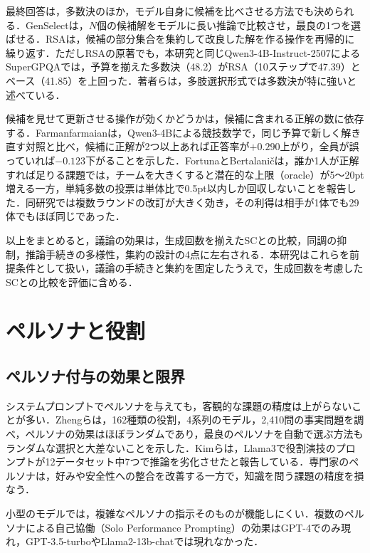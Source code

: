 最終回答は，多数決のほか，モデル自身に候補を比べさせる方法でも決められる．GenSelect\cite{toshniwal2025genselect}は，$N$個の候補解をモデルに長い推論で比較させ，最良の1つを選ばせる．RSA\cite{venkatraman2025rsa}は，候補の部分集合を集約して改良した解を作る操作を再帰的に繰り返す．ただしRSAの原著でも，本研究と同じQwen3-4B-Instruct-2507によるSuperGPQAでは，予算を揃えた多数決（48.2）がRSA（10ステップで47.39）とベース（41.85）を上回った．著者らは，多肢選択形式では多数決が特に強いと述べている．

候補を見せて更新させる操作が効くかどうかは，候補に含まれる正解の数に依存する．Farmanfarmaian\cite{farmanfarmaian2026candidatefree}は，Qwen3-4Bによる競技数学で，同じ予算で新しく解き直す対照と比べ，候補に正解が2つ以上あれば正答率が$+0.290$上がり，全員が誤っていれば$-0.123$下がることを示した．FortunaとBertalani\v{c}\cite{fortuna2026disjunctive}は，誰か1人が正解すれば足りる課題では，チームを大きくすると潜在的な上限（oracle）が5〜20pt増える一方，単純多数の投票は単体比で0.5pt以内しか回収しないことを報告した．同研究では複数ラウンドの改訂が大きく効き，その利得は相手が1体でも29体でもほぼ同じであった．

以上をまとめると，議論の効果は，生成回数を揃えたSCとの比較，同調の抑制，推論手続きの多様性，集約の設計の4点に左右される．本研究はこれらを前提条件として扱い，議論の手続きと集約を固定したうえで，生成回数を考慮したSCとの比較を評価に含める．

\section{ペルソナと役割}
\label{sec:2.2}

\subsection{ペルソナ付与の効果と限界}
\label{sec:2.2.1}

システムプロンプトでペルソナを与えても，客観的な課題の精度は上がらないことが多い．Zhengら\cite{zheng2024persona}は，162種類の役割，4系列のモデル，2,410問の事実問題を調べ，ペルソナの効果はほぼランダムであり，最良のペルソナを自動で選ぶ方法もランダムな選択と大差ないことを示した．Kimら\cite{kim2024persona}は，Llama3で役割演技のプロンプトが12データセット中7つで推論を劣化させたと報告している．専門家のペルソナは，好みや安全性への整合を改善する一方で，知識を問う課題の精度を損なう\cite{hu2026prism}．

小型のモデルでは，複雑なペルソナの指示そのものが機能しにくい．複数のペルソナによる自己協働（Solo Performance Prompting）の効果はGPT-4でのみ現れ，GPT-3.5-turboやLlama2-13b-chatでは現れなかった\cite{wang2024spp}．

